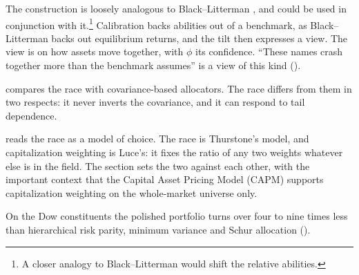 The construction is loosely analogous to Black--Litterman \parencite{black1992},
and could be used in conjunction with it.\footnote{A closer analogy to
Black--Litterman would shift the relative abilities.} Calibration backs abilities out of a
benchmark, as Black--Litterman backs out equilibrium returns, and the tilt then
expresses a view. The view is on how assets move together, with $\phi$ its
confidence. ``These names crash together more than the benchmark assumes'' is a
view of this kind ().

 compares the race with covariance-based allocators. The
race differs from them in two respects: it never inverts the covariance, and it
can respond to tail dependence.

 reads the race as a model of choice. The race is
Thurstone's model, and capitalization weighting is Luce's: it fixes the ratio of
any two weights whatever else is in the field. The section sets the two against
each other, with the important context that the Capital Asset Pricing Model (CAPM)
supports capitalization weighting on the whole-market universe only.

On the Dow constituents the polished portfolio turns over four to nine times less
than hierarchical risk parity, minimum variance and Schur allocation
().
